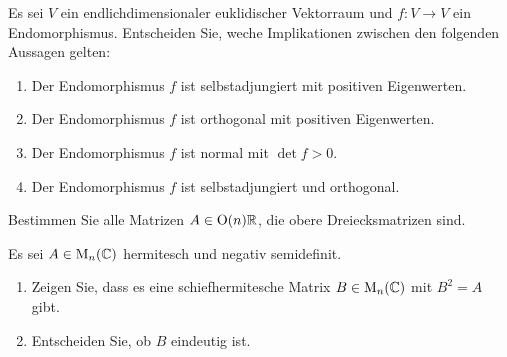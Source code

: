 \documentclass[a4paper, 10pt]{scrartcl}
\begin{document}
\begin{question}
  Es sei $V$ ein endlichdimensionaler euklidischer Vektorraum und $f \colon V \to V$ ein Endomorphismus.
  Entscheiden Sie, weche Implikationen zwischen den folgenden Aussagen gelten:
  \begin{enumerate}
    \item
      Der Endomorphismus $f$ ist selbstadjungiert mit positiven Eigenwerten.
    \item
      Der Endomorphismus $f$ ist orthogonal mit positiven Eigenwerten.
    \item
      Der Endomorphismus $f$ ist normal mit $\det f > 0$.
    \item
      Der Endomorphismus $f$ ist selbstadjungiert und orthogonal.
  \end{enumerate}
\end{question}





\begin{question}
  Bestimmen Sie alle Matrizen $A \in \operatorname{O}(n){\mathbb{R}}$, die obere Dreiecksmatrizen sind.
\end{question}


\begin{question}
  Es sei $A \in \operatorname{M}_{n}(\mathbb{C})$ hermitesch und negativ semidefinit.
  \begin{enumerate}
    \item
      Zeigen Sie, dass es eine schiefhermitesche Matrix $B \in \operatorname{M}_{n}(\mathbb{C})$ mit $B^2 = A$ gibt.
    \item
      Entscheiden Sie, ob $B$ eindeutig ist.
  \end{enumerate}
\end{question}
\end{document}
